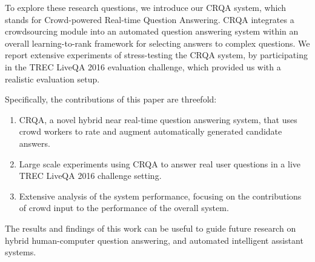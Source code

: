 To explore these research questions, we introduce our CRQA system, which stands for Crowd-powered Real-time Question Answering.
CRQA integrates a crowdsourcing module into an automated question answering system within an overall learning-to-rank framework for selecting answers to complex questions.
We report extensive experiments of stress-testing the CRQA system, by participating in the TREC LiveQA 2016 evaluation challenge, which provided us with a realistic evaluation setup.

Specifically, the contributions of this paper are threefold:
\begin{enumerate}
	\item CRQA, a novel hybrid near real-time question answering system, that uses crowd workers to rate and augment automatically generated candidate answers.
	\item Large scale experiments using CRQA to answer real user questions in a live TREC LiveQA 2016 challenge setting.
	\item Extensive analysis of the system performance, focusing on the contributions of crowd input to the performance of the overall system.
\end{enumerate}

The results and findings of this work can be useful to guide future research on hybrid human-computer question answering, and automated intelligent assistant systems.